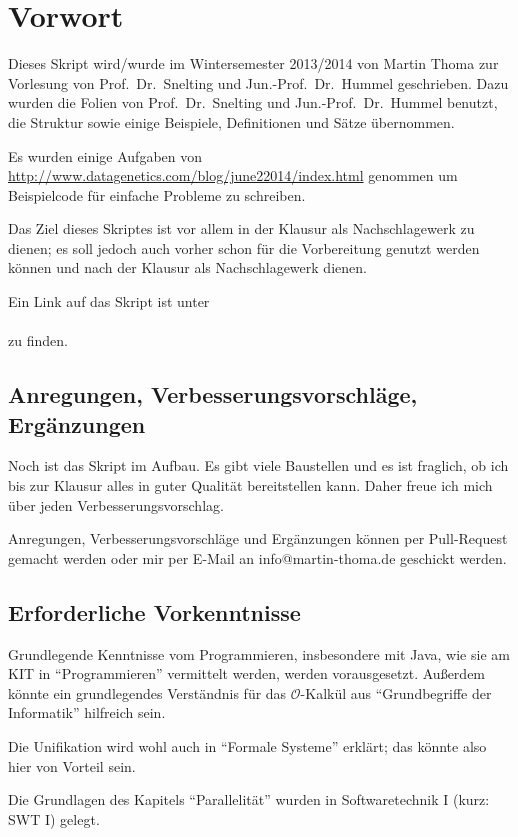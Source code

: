 \chapter*{Vorwort}
Dieses Skript wird/wurde im Wintersemester 2013/2014
von Martin Thoma zur Vorlesung von Prof.~Dr.~Snelting und Jun.-Prof.~Dr.~Hummel
geschrieben. Dazu wurden
die Folien von Prof.~Dr.~Snelting und Jun.-Prof.~Dr.~Hummel benutzt, die Struktur
sowie einige Beispiele, Definitionen und Sätze übernommen.

Es wurden einige Aufgaben von \url{http://www.datagenetics.com/blog/june22014/index.html}
genommen um Beispielcode für einfache Probleme zu schreiben.

Das Ziel dieses Skriptes ist vor allem
in der Klausur als Nachschlagewerk zu dienen; es soll jedoch auch
vorher schon für die Vorbereitung genutzt werden können und nach
der Klausur als Nachschlagewerk dienen.

Ein Link auf das Skript ist unter \\
\href{http://martin-thoma.com/programmierparadigmen/}{}\\
zu finden.

\section*{Anregungen, Verbesserungsvorschläge, Ergänzungen}
Noch ist das Skript im Aufbau. Es gibt viele Baustellen und es ist
fraglich, ob ich bis zur Klausur alles in guter Qualität bereitstellen
kann. Daher freue ich mich über jeden Verbesserungsvorschlag.

Anregungen, Verbesserungsvorschläge und Ergänzungen können per
Pull-Request gemacht werden oder mir per E-Mail an info@martin-thoma.de
geschickt werden.

\section*{Erforderliche Vorkenntnisse}
Grundlegende Kenntnisse vom Programmieren, insbesondere mit Java,
wie sie am KIT in \enquote{Programmieren} vermittelt werden, werden
vorausgesetzt. Außerdem könnte ein grundlegendes Verständnis für
das $\mathcal{O}$-Kalkül aus \enquote{Grundbegriffe der Informatik} hilfreich sein.

Die Unifikation wird wohl auch in \enquote{Formale Systeme}
erklärt; das könnte also hier von Vorteil sein.

Die Grundlagen des Kapitels \enquote{Parallelität} wurden in Softwaretechnik I
(kurz: SWT I) gelegt.